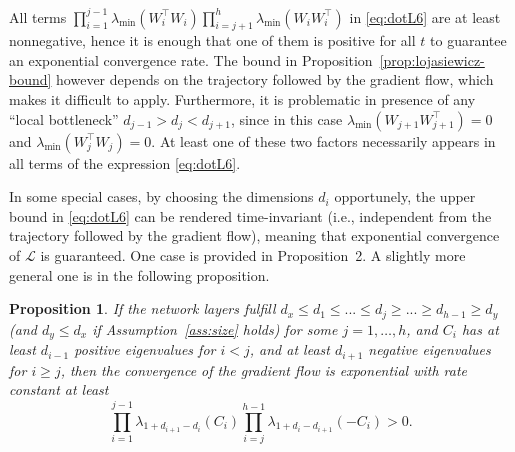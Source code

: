 \documentclass{article}
\newtheorem{proposition}{Proposition}
\newcommand{\1}{\mathds{1}}
\newcommand{\beq}{\begin{equation}}
\newcommand{\eeq}{\end{equation}}
\begin{document}
All terms $ \prod_{i =1}^{j-1} \lambda_{\min}(W_i^\top  W_i) \prod_{i =j+1}^{h} \lambda_{\min}(W_i W_i^\top) $ in \eqref{eq:dotL6} are at least nonnegative, hence it is enough that one of them is positive for all $ t $ to guarantee an exponential convergence rate.
The bound in Proposition~\ref{prop:lojasiewicz-bound} however depends on the trajectory followed by the gradient flow, which makes it difficult to apply. Furthermore, it is problematic in presence of any ``local bottleneck'' $ d_{j-1} > d_j < d_{j+1} $, since in this case $ \lambda_{\min}(W_{j+1} W_{j+1}^\top) = 0 $ and $\lambda_{\min}(W_j^\top W_j) = 0$. At least one of these two factors necessarily appears in all terms of the expression \eqref{eq:dotL6}.

In some special cases, by choosing the dimensions $ d_i $ opportunely, the upper bound in \eqref{eq:dotL6} can be rendered time-invariant (i.e., independent from the trajectory followed by the gradient flow), meaning that exponential convergence of $ \mathcal{L}$ is guaranteed.
One case is provided in  \cite{chitour2018geometric} Proposition~2. A slightly more general one is in the following proposition.
\begin{proposition}
\label{prop:conv-rate-sp-case1}
If the network layers fulfill $d_x \leq d_1 \leq ... \leq d_j \geq ... \geq d_{h-1} \geq d_y$ (and $d_y \leq d_x$ if Assumption~\ref{ass:size} holds) for some $ j = 1, \ldots, h$, and $ C_i $ has at least $d_{i-1}$ positive eigenvalues for $ i < j $, and at least $d_{i+1}$ negative eigenvalues for $ i \geq j $, then the convergence of the gradient flow is exponential with rate constant at least 
\beq
\prod_{i=1}^{j-1} \lambda_{1+d_{i+1}-d_{i}} ( C_{i} ) \prod_{i=j}^{h-1} \lambda_{1+d_{i}-d_{i+1}} ( -C_{i} ) > 0.
\label{eq:dotL10}
\eeq
\end{proposition}
\end{document}
